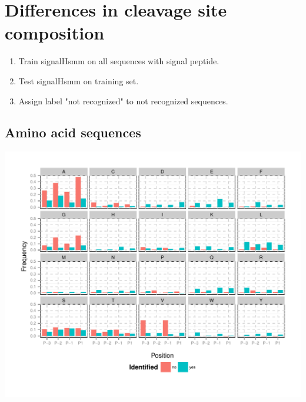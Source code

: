 \documentclass[10pt]{beamer}\usepackage[]{graphicx}\usepackage[]{color}
\makeatletter
\def\maxwidth{ %
  \ifdim\Gin@nat@width>\linewidth
    \linewidth
  \else
    \Gin@nat@width
  \fi
}
\makeatother
\begin{document}
\section{Differences in cleavage site composition}

\begin{frame}
\begin{enumerate}
\item Train signalHsmm on all sequences with signal peptide.
\item Test signalHsmm on training set.
\item Assign label "not recognized" to not recognized sequences.
\end{enumerate}
\end{frame}


\subsection{Amino acid sequences}

\begin{frame}

\includegraphics[width=\maxwidth]{figure/unnamed-chunk-4-1} 

\end{frame}
\end{document}
